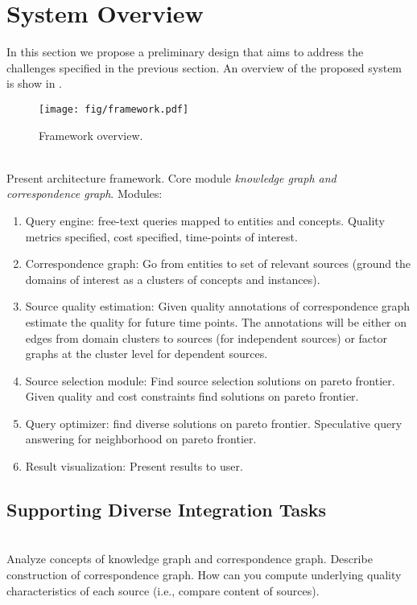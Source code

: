 \documentclass{sig-alternate}
\begin{document}
\section{System Overview}
\label{sec:overview}
In this section we propose a preliminary design that aims to address the challenges specified in the previous section. An overview of the proposed system is show in . 
\begin{figure}
	\begin{center}
	\texttt{[image: fig/framework.pdf]}
	\caption{Framework overview.}
	\label{fig:system}
	\end{center}
\end{figure}



\ \\Present architecture framework. Core module {\em knowledge graph and correspondence graph}. Modules:
\begin{enumerate}
\item Query engine: free-text queries mapped to entities and concepts. Quality metrics specified, cost specified, time-points of interest. 
\item Correspondence graph: Go from entities to set of relevant sources (ground the domains of interest as a clusters of concepts and instances). 
\item Source quality estimation: Given quality annotations of correspondence graph estimate the quality for future time points. The annotations will be either on edges from domain clusters to sources (for independent sources) or factor graphs at the cluster level for dependent sources. 
\item Source selection module: Find source selection solutions on pareto frontier. Given quality and cost constraints find solutions on pareto frontier. 
\item Query optimizer: find diverse solutions on pareto frontier. Speculative query answering for neighborhood on pareto frontier. 
\item Result visualization: Present results to user. 
\end{enumerate}

\subsection{Supporting Diverse Integration Tasks}

\ \\Analyze concepts of knowledge graph and correspondence graph. Describe construction of correspondence graph. How can you compute underlying quality characteristics of each source (i.e., compare content of sources).
\end{document}
